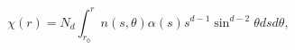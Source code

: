 \begin{equation}
\label{suscept}
\chi(r)=N_d\int_{r_0}^r n(s,\theta)\alpha(s) s^{d-1}\sin^{d-2}\theta 
ds d\theta,
\end{equation}

